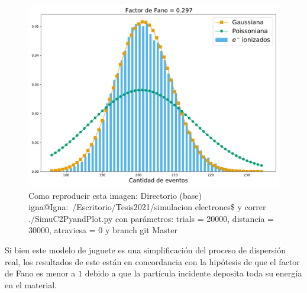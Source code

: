 \begin{figure}%
    \centering
    \includegraphics[scale=0.35]{Figs/Orden0_fano0.pdf}
    \caption{\footnotesize{Como reproducir esta imagen: Directorio (base) igna@Igna:~/Escritorio/Tesis2021/simulacion electrones\$ y correr ./SimuC2PyandPlot.py con parámetros: trials = 20000, distancia = 30000, atraviesa = 0 y branch git Master}}
    \label{fig:SimulacionOrden0Fano0}
\end{figure}
\indent Si bien este modelo de juguete es una simplificación del proceso de dispersión real, los resultados de este están en concordancia con la hipótesis de que el factor de Fano es menor a $1$ debido a que la partícula incidente deposita toda su energía en el material.\\
